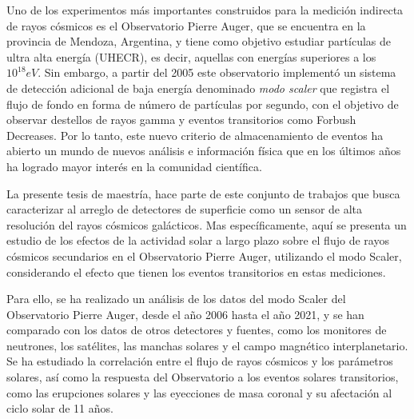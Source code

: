 Uno de los experimentos más importantes construidos para la medición indirecta de rayos cósmicos es el Observatorio Pierre Auger, que se encuentra en la provincia de Mendoza, Argentina, y tiene como objetivo estudiar partículas de ultra alta energía (UHECR), es decir, aquellas con energías superiores a los $10^{18}eV$. Sin embargo, a partir del 2005 este observatorio implementó un sistema de detección adicional de baja energía denominado \textit{modo scaler} que registra el flujo de fondo en forma de número de partículas por segundo, con el objetivo de observar destellos de rayos gamma y eventos transitorios como Forbush Decreases. Por lo tanto, este nuevo criterio de almacenamiento de eventos ha abierto un mundo de nuevos análisis e información física que en los últimos años ha logrado mayor interés en la comunidad científica.

La presente tesis de maestría, hace parte de este conjunto de trabajos que busca caracterizar al arreglo de detectores de superficie como un sensor de alta resolución del rayos cósmicos galácticos. Mas específicamente, aquí se presenta un estudio de los efectos de la actividad solar a largo plazo sobre el flujo de rayos cósmicos secundarios en el Observatorio Pierre Auger, utilizando el modo Scaler, considerando el efecto que tienen los eventos transitorios en estas mediciones. 

Para ello, se ha realizado un análisis de los datos del modo Scaler del Observatorio Pierre Auger, desde el año 2006 hasta el año 2021, y se han comparado con los datos de otros detectores y fuentes, como los monitores de neutrones, los satélites, las manchas solares y el campo magnético interplanetario. Se ha estudiado la correlación entre el flujo de rayos cósmicos y los parámetros solares, así como la respuesta del Observatorio a los eventos solares transitorios, como las erupciones solares y las eyecciones de masa coronal y su afectación al ciclo solar de 11 años.


